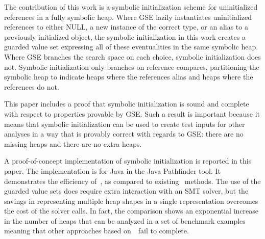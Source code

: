 The contribution of this work is a symbolic initialization scheme for
uninitialized references in a fully symbolic heap. Where GSE lazily
instantiates uninitialized references to either NULL, a new instance
of the correct type, or an alias to a previously initialized object,
the symbolic initialization in this work creates a guarded value set
expressing all of these eventualities in the same symbolic heap. Where
GSE branches the search space on each choice, symbolic initialization
does not. Symbolic initialization only branches on reference compares,
partitioning the symbolic heap to indicate heaps where the references
alias and heaps where the references do not.

This paper includes a proof that symbolic initialization is sound and
complete with respect to properties provable by GSE. Such a result is
important because it means that symbolic initialization can be used to
create test inputs for other analyses in a way that is provably
correct with regards to GSE: there are no missing heaps and there are
no extra heaps.

A proof-of-concept implementation of symbolic initialization is
reported in this paper. The implementation is for Java in the Java
Pathfinder tool. It demonstrates the efficiency of~\symtxt{}, as
compared to existing~\gsetxt{} methods. The use of the guarded value
sets does require extra interaction with an SMT solver, but the
savings in representing multiple heap shapes in a single
representation overcomes the cost of the solver calls. In fact, the
comparison shows an exponential increase in the number of heaps that
can be analyzed in a set of benchmark examples meaning that other
approaches based on~\gsetxt\ fail to complete.

